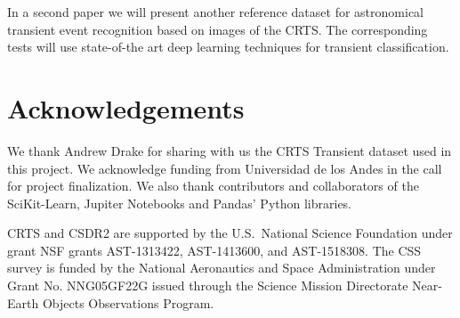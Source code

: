 \documentclass{aastex62}
\begin{document}
In a second paper we will present another reference dataset for
astronomical transient event recognition based on images of the
CRTS.
The corresponding tests will use  state-of-the art deep learning
techniques for transient classification. 

\section*{Acknowledgements}

We thank Andrew Drake for sharing with us the CRTS Transient dataset
used in this project.  
We acknowledge funding from Universidad de los Andes in the call for
project finalization.
We also thank contributors and collaborators of the SciKit-Learn,
Jupiter Notebooks and Pandas' Python libraries.  

CRTS and CSDR2 are supported by the U.S.~National Science 
Foundation under grant NSF grants AST-1313422, AST-1413600, and 
AST-1518308.  The CSS survey is funded by the National Aeronautics
and Space Administration under Grant No. NNG05GF22G issued through
the Science Mission Directorate Near-Earth Objects Observations Program.



\end{document}
